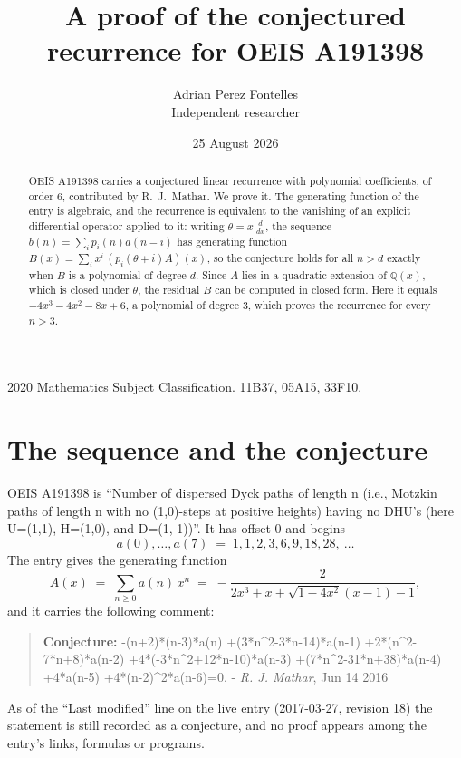 \documentclass[11pt,a4paper]{article}
\title{A proof of the conjectured recurrence for OEIS A191398}
\author{Adrian Perez Fontelles\\ \small Independent researcher}
\date{25 August 2026}
\theoremstyle{plain}
\theoremstyle{definition}
\begin{document}
\maketitle

\begin{abstract}
OEIS A191398 carries a conjectured linear recurrence with polynomial coefficients, of
order 6, contributed by R.~J.~Mathar. We prove it. The generating function of the
entry is algebraic, and the recurrence is equivalent to the vanishing of an explicit
differential operator applied to it: writing $\theta=x\,\frac{d}{dx}$, the sequence
$b(n)=\sum_{i}p_{i}(n)a(n-i)$ has generating function
$B(x)=\sum_{i}x^{i}\,(p_{i}(\theta+i)A)(x)$, so the conjecture holds for all $n>d$ exactly
when $B$ is a polynomial of degree $d$. Since $A$ lies in a quadratic extension of
$\mathbb{Q}(x)$, which is closed under $\theta$, the residual $B$ can be computed in
closed form. Here it equals $- 4 x^{3} - 4 x^{2} - 8 x + 6$, a polynomial of degree $3$, which proves
the recurrence for every $n>3$.
\end{abstract}

\noindent\small 2020 Mathematics Subject Classification. 11B37, 05A15, 33F10.\normalsize

\section{The sequence and the conjecture}

OEIS A191398 is ``Number of dispersed Dyck paths of length n (i.e., Motzkin paths of length n with no (1,0)-steps at positive heights) having no DHU's (here U=(1,1), H=(1,0), and D=(1,-1))''. It has offset $0$ and begins
\[
a(0),\dots,a(7)\;=\;1, 1, 2, 3, 6, 9, 18, 28,\ \dots
\]
The entry gives the generating function
\begin{equation}\label{eq:gf}
A(x)\;=\;\sum_{n\ge 0} a(n)\,x^{n}\;=\;- \frac{2}{2 x^{3} + x + \sqrt{1 - 4 x^{2}} \left(x - 1\right) - 1} ,
\end{equation}
and it carries the following comment:
\begin{quote}\small
\textbf{Conjecture:} -(n+2)*(n-3)*a(n) +(3*n\^{}2-3*n-14)*a(n-1) +2*(n\^{}2-7*n+8)*a(n-2) +4*(-3*n\^{}2+12*n-10)*a(n-3) +(7*n\^{}2-31*n+38)*a(n-4) +4*a(n-5) +4*(n-2)\^{}2*a(n-6)=0. - \emph{R. J. Mathar}, Jun 14 2016
\end{quote}
As of the ``Last modified'' line on the live entry (2017-03-27, revision 18) the
statement is still recorded as a conjecture, and no proof appears among the entry's links,
formulas or programs.
\end{document}
